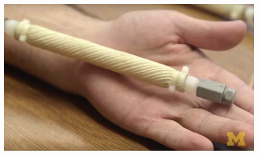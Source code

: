 \documentclass[25pt, a0paper, portrait]{tikzposter}
\begin{document}
{\begin{minipage}[t]{0.15\linewidth}
\begin{tikzfigure}
        \end{tikzfigure}
    \end{minipage} %
    \begin{minipage}[t]{0.2\linewidth}
        \centering
        \begin{tikzfigure}
            \includegraphics[width=\linewidth, height=0.075\textheight]{images/FREEhand.jpg}
        \end{tikzfigure}
    \end{minipage}
}
\end{document}
